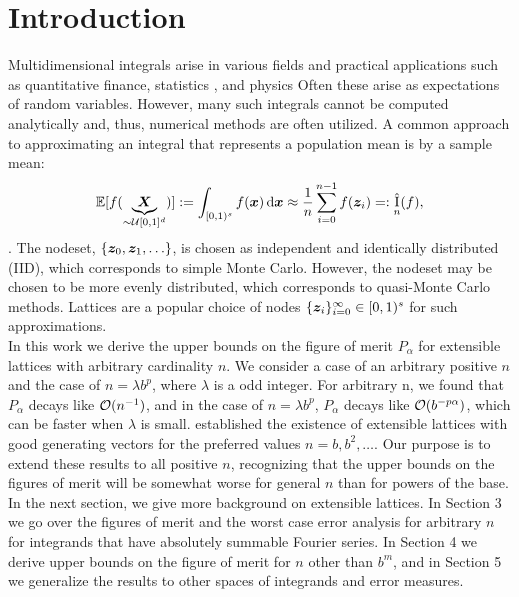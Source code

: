 \documentclass[authoryear]{elsarticle}
\newcommand{\appxintn}{\appxint_n}
\DeclareMathOperator{\appxint}{\hat{I}}
\newcommand{\FredNote}[1]{{\color{blue}#1}}
\newcommand{\LarysaNote}[1]{{\color{violet}#1}}
\begin{document}
\section{Introduction}



Multidimensional integrals arise in various fields and practical applications \LarysaNote{such as quantitative finance, statistics , and physics } \FredNote{Often these arise as expectations of random variables.}  However, many such integrals cannot be computed analytically and, thus, numerical methods are often utilized. \FredNote{A common approach to approximating an integral that represents a population mean is by a sample mean:} 
\[
\mathbb{E}[f(\underbrace{\vX}_{\sim \mathcal{U}[0,1]^d})] : = \int_{[0,1)^s} f(\vx) \, \dif \vx \approx \frac{1}{n} \sum_{i=0}^{n-1} f(\vz_i) =:\appxintn(f),
\]
\citep{DicEtal22a,Nie92,SloJoe94}.
The nodeset, $\{\boldsymbol{z}_0, \boldsymbol{z}_1, \ldots \}$, is chosen as independent and identically distributed (IID), which corresponds to simple Monte Carlo. However, the nodeset may be chosen to be more evenly distributed, which corresponds to quasi-Monte Carlo methods. Lattices are a popular choice of nodes $\{\boldsymbol{z}_i\}_{i=0}^{\infty} \in [0,1)^s$ for such approximations. \\


In this work we derive the upper bounds on the figure of merit $P_{\alpha}$ for extensible lattices with arbitrary cardinality $n$. We consider a case of an arbitrary positive $n$ and the case of $n = \lambda b^p$, where $\lambda$ is a odd integer. For arbitrary n, we found that $P_{\alpha}$ decays like $\operatorname{{\mathcal O}}(n^{-1})$, and in the case of $n = \lambda b^p$, $P_{\alpha}$ decays like $\operatorname{{\mathcal O}}(b^{-p \alpha})$, which can be faster when $\lambda$ is small. \cite{HicNie03a} established the existence of extensible lattices with good generating vectors for the preferred values $n = b, b^2, \ldots$.  Our purpose is to extend these results to all positive $n$, recognizing that the upper bounds on the figures of merit will be somewhat worse for general $n$ than for powers of the base. \\



   
In the next section, we give more background on extensible lattices. In Section 3 we go over the figures of merit and the worst case error analysis for arbitrary $n$ for integrands that have absolutely summable Fourier series. In Section 4 we derive upper bounds on the figure of merit %
for $n$ other than $b^m$, and in Section 5 we generalize the results to other spaces of integrands and error measures. 
\end{document}
